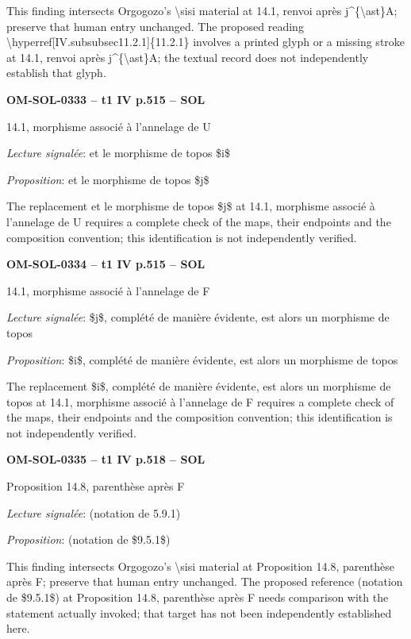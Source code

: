 This finding intersects Orgogozo's \textbackslash{}sisi material at 14.1, renvoi après j\textasciicircum{}\{\textbackslash{}ast\}A; preserve that human entry unchanged. The proposed reading \textbackslash{}hyperref[IV.subsubsec11.2.1]\{11.2.1\} involves a printed glyph or a missing stroke at 14.1, renvoi après j\textasciicircum{}\{\textbackslash{}ast\}A; the textual record does not independently establish that glyph.\par
\par\noindent\textbf{OM-SOL-0333 -- t1 IV p.515 -- SOL}\par
14.1, morphisme associé à l'annelage de U\par
\emph{Lecture signalée}: et le morphisme de topos \$i\$\par
\emph{Proposition}: et le morphisme de topos \$j\$\par
The replacement et le morphisme de topos \$j\$ at 14.1, morphisme associé à l'annelage de U requires a complete check of the maps, their endpoints and the composition convention; this identification is not independently verified.\par
\par\noindent\textbf{OM-SOL-0334 -- t1 IV p.515 -- SOL}\par
14.1, morphisme associé à l'annelage de F\par
\emph{Lecture signalée}: \$j\$, complété de manière évidente, est alors un morphisme de topos\par
\emph{Proposition}: \$i\$, complété de manière évidente, est alors un morphisme de topos\par
The replacement \$i\$, complété de manière évidente, est alors un morphisme de topos at 14.1, morphisme associé à l'annelage de F requires a complete check of the maps, their endpoints and the composition convention; this identification is not independently verified.\par
\par\noindent\textbf{OM-SOL-0335 -- t1 IV p.518 -- SOL}\par
Proposition 14.8, parenthèse après F\par
\emph{Lecture signalée}: (notation de 5.9.1)\par
\emph{Proposition}: (notation de \$9.5.1\$)\par
This finding intersects Orgogozo's \textbackslash{}sisi material at Proposition 14.8, parenthèse après F; preserve that human entry unchanged. The proposed reference (notation de \$9.5.1\$) at Proposition 14.8, parenthèse après F needs comparison with the statement actually invoked; that target has not been independently established here.\par
